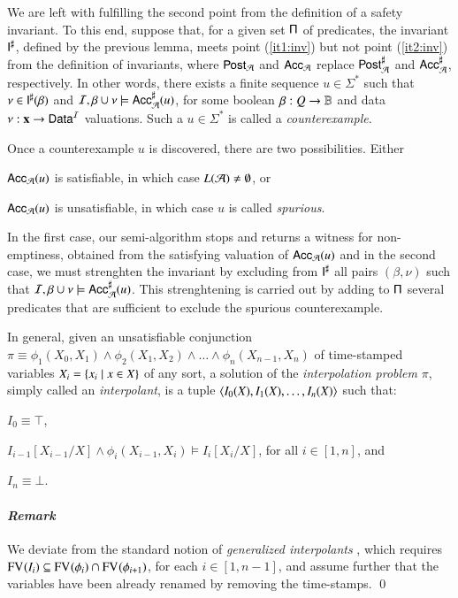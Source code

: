 \documentclass[10pt,conference,letterpaper,twocolumn]{IEEEtran}
\begin{document}
We are left with fulfilling the second point from the definition of a
safety invariant. To this end, suppose that, for a given set $\mathsf{\Pi}$
of predicates, the invariant ${\mathsf{I}}^\sharp$, defined by the previous
lemma, meets point (\ref{it1:inv}) but not point (\ref{it2:inv}) from
the definition of invariants, where $\mathsf{Post}_{\mathcal{A}}$ and $\mathsf{Acc}_{\mathcal{A}}$
replace ${\mathsf{Post}}^\sharp_{\mathcal{A}}$ and ${\mathsf{Acc}}^\sharp_{\mathcal{A}}$, respectively. In
other words, there exists a finite sequence $u \in \Sigma^*$ such that
$\nu \in {\mathsf{I}}^\sharp(\beta)$ and $\mathcal{I},\beta\cup\nu \models
{\mathsf{Acc}}^\sharp_{\mathcal{A}}(u)$, for some boolean $\beta : Q \rightarrow \mathbb{B}$
and data $\nu : \mathbf x \rightarrow \mathsf{Data}^{\mathcal{I}}$ valuations. Such
a $u\in\Sigma^*$ is called a \emph{counterexample}.

Once a counterexample $u$ is discovered, there are two
possibilities. Either\begin{inparaenum}[(i)]
\item $\mathsf{Acc}_{\mathcal{A}}(u)$ is satisfiable, in which case $L(\mathcal{A}) \neq \emptyset$, or
\item $\mathsf{Acc}_{\mathcal{A}}(u)$ is unsatisfiable, in which case $u$ is called
  \emph{spurious}.
\end{inparaenum}
In the first case, our semi-algorithm stops and returns a witness for
non-emptiness, obtained from the satisfying valuation of
$\mathsf{Acc}_{\mathcal{A}}(u)$ and in the second case, we must strenghten the
invariant by excluding from ${\mathsf{I}}^\sharp$ all pairs $(\beta,\nu)$ such
that $\mathcal{I},\beta\cup\nu \models {\mathsf{Acc}}^\sharp_{\mathcal{A}}(u)$. This strenghtening
is carried out by adding to $\mathsf{\Pi}$ several predicates that are
sufficient to exclude the spurious counterexample.

In general, given an unsatisfiable conjunction $\pi \equiv
\phi_1(X_0,X_1) \wedge \phi_2(X_1,X_2) \wedge \ldots \wedge
\phi_n(X_{n-1},X_n)$ of time-stamped variables $X_i = \left\{ x_i \mid x
  \in X \right\}$ of any sort, a solution of the \emph{interpolation problem}
$\pi$, simply called an \emph{interpolant}, is a tuple $\left\langle I_0(X),
  I_1(X), \ldots, I_n(X) \right\rangle$ such that:\begin{inparaenum}[(i)]
\item $I_0 \equiv \top$,  
%
\item $I_{i-1}[X_{i-1}/X] \wedge \phi_i(X_{i-1},X_i) \models
  I_i[X_i/X]$, for all $i \in [1,n]$, and
%
\item $I_n \equiv \bot$. 
\end{inparaenum}

\paragraph{\em Remark} 
We deviate from the standard notion of \emph{generalized interpolants}
\cite{mcmillan06}, which requires $\mathrm{FV}^{}(I_i) \subseteq \mathrm{FV}^{}(\phi_i)
\cap \mathrm{FV}^{}(\phi_{i+1})$, for each $i \in [1,n-1]$, and assume further
that the variables have been already renamed by removing the
time-stamps. \qed
\end{document}
